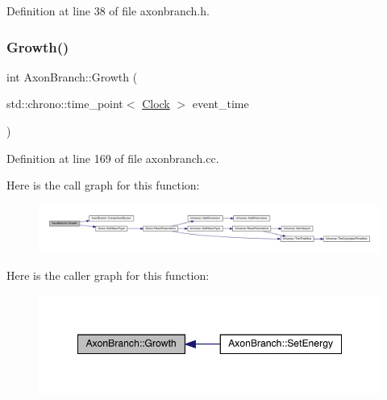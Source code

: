 Definition at line 38 of file axonbranch.\+h.

\mbox{\label{class_axon_branch_a6e434a57873ab0fdbc72cf7ecc7228ed}} 
\subsubsection{\texorpdfstring{Growth()}{Growth()}}
{\footnotesize\ttfamily int Axon\+Branch\+::\+Growth (\begin{DoxyParamCaption}\item[{std\+::chrono\+::time\+\_\+point$<$ \hyperlink{universe_8h_a0ef8d951d1ca5ab3cfaf7ab4c7a6fd80}{Clock} $>$}]{event\+\_\+time }\end{DoxyParamCaption})}



Definition at line 169 of file axonbranch.\+cc.

Here is the call graph for this function\+:
\nopagebreak
\begin{figure}[H]
\begin{center}
\leavevmode
\includegraphics[width=350pt]{class_axon_branch_a6e434a57873ab0fdbc72cf7ecc7228ed_cgraph}
\end{center}
\end{figure}
Here is the caller graph for this function\+:
\nopagebreak
\begin{figure}[H]
\begin{center}
\leavevmode
\includegraphics[width=348pt]{class_axon_branch_a6e434a57873ab0fdbc72cf7ecc7228ed_icgraph}
\end{center}
\end{figure}
\mbox{\label{class_axon_branch_a06753a2a61941a59d86510e51ba44b15}} 
